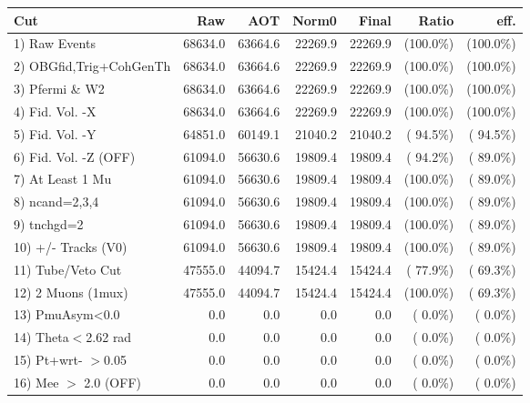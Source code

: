  \begin{table}[h!]\centering
 \begin{tabular}{||l||r|r|r|r|r|r||}
 \hline
 \hline
 Cut & Raw & AOT & Norm0 & Final & Ratio & eff.       \\
 \hline
  1) Raw Events           &      68634.0 &      63664.6 &      22269.9 &      22269.9 & (100.0\%) & (100.0\%) \\
  2) OBGfid,Trig+CohGenTh &      68634.0 &      63664.6 &      22269.9 &      22269.9 & (100.0\%) & (100.0\%) \\
  3) Pfermi \& W2         &      68634.0 &      63664.6 &      22269.9 &      22269.9 & (100.0\%) & (100.0\%) \\
  4) Fid. Vol. -X         &      68634.0 &      63664.6 &      22269.9 &      22269.9 & (100.0\%) & (100.0\%) \\
  5) Fid. Vol. -Y         &      64851.0 &      60149.1 &      21040.2 &      21040.2 & ( 94.5\%) & ( 94.5\%) \\
  6) Fid. Vol. -Z (OFF)   &      61094.0 &      56630.6 &      19809.4 &      19809.4 & ( 94.2\%) & ( 89.0\%) \\
  7) At Least 1 Mu        &      61094.0 &      56630.6 &      19809.4 &      19809.4 & (100.0\%) & ( 89.0\%) \\
  8) ncand=2,3,4          &      61094.0 &      56630.6 &      19809.4 &      19809.4 & (100.0\%) & ( 89.0\%) \\
  9) tnchgd=2             &      61094.0 &      56630.6 &      19809.4 &      19809.4 & (100.0\%) & ( 89.0\%) \\
 10) +/- Tracks (V0)      &      61094.0 &      56630.6 &      19809.4 &      19809.4 & (100.0\%) & ( 89.0\%) \\
 11) Tube/Veto Cut        &      47555.0 &      44094.7 &      15424.4 &      15424.4 & ( 77.9\%) & ( 69.3\%) \\
 12) 2 Muons (1mux)       &      47555.0 &      44094.7 &      15424.4 &      15424.4 & (100.0\%) & ( 69.3\%) \\
 13) PmuAsym<0.0          &          0.0 &          0.0 &          0.0 &          0.0 & (  0.0\%) & (  0.0\%) \\
 14) Theta$<$2.62 rad     &          0.0 &          0.0 &          0.0 &          0.0 & (  0.0\%) & (  0.0\%) \\
 15) Pt+wrt- $>$0.05      &          0.0 &          0.0 &          0.0 &          0.0 & (  0.0\%) & (  0.0\%) \\
 16) Mee $>$ 2.0  (OFF)   &          0.0 &          0.0 &          0.0 &          0.0 & (  0.0\%) & (  0.0\%) \\

\end{tabular}
\end{table}
